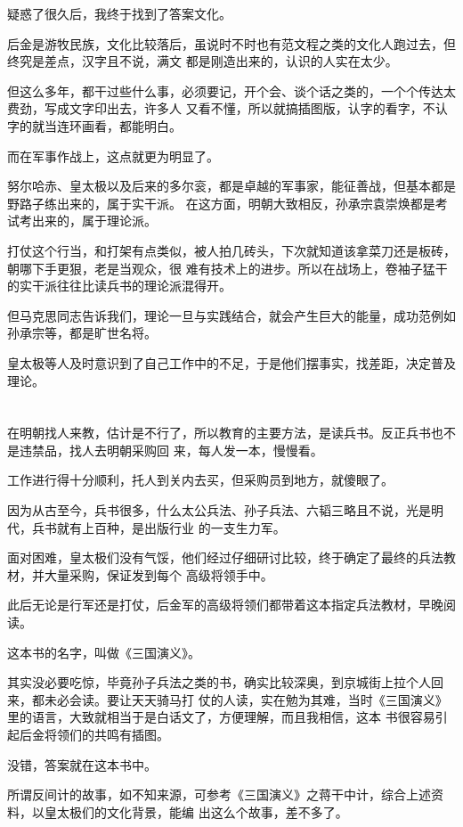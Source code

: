 \documentclass[11pt,a4paper,onecolumn]{article}
\begin{document}
疑惑了很久后，我终于找到了答案\myrule 文化。

后金是游牧民族，文化比较落后，虽说时不时也有范文程之类的文化人跑过去，但终究是差点，汉字且不说，满文
都是刚造出来的，认识的人实在太少。

但这么多年，都干过些什么事，必须要记，开个会、谈个话之类的，一个个传达太费劲，写成文字印出去，许多人
又看不懂，所以就搞插图版，认字的看字，不认字的就当连环画看，都能明白。

而在军事作战上，这点就更为明显了。

努尔哈赤、皇太极以及后来的多尔衮，都是卓越的军事家，能征善战，但基本都是野路子练出来的，属于实干派。
在这方面，明朝大致相反，孙承宗袁崇焕都是考试考出来的，属于理论派。

打仗这个行当，和打架有点类似，被人拍几砖头，下次就知道该拿菜刀还是板砖，朝哪下手更狠，老是当观众，很
难有技术上的进步。所以在战场上，卷袖子猛干的实干派往往比读兵书的理论派混得开。

但马克思同志告诉我们，理论一旦与实践结合，就会产生巨大的能量，成功范例如孙承宗等，都是旷世名将。

皇太极等人及时意识到了自己工作中的不足，于是他们摆事实，找差距，决定普及理论。

\section[\thesection]{}

在明朝找人来教，估计是不行了，所以教育的主要方法，是读兵书。反正兵书也不是违禁品，找人去明朝采购回
来，每人发一本，慢慢看。

工作进行得十分顺利，托人到关内去买，但采购员到地方，就傻眼了。

因为从古至今，兵书很多，什么太公兵法、孙子兵法、六韬三略且不说，光是明代，兵书就有上百种，是出版行业
的一支生力军。

面对困难，皇太极们没有气馁，他们经过仔细研讨比较，终于确定了最终的兵法教材，并大量采购，保证发到每个
高级将领手中。

此后无论是行军还是打仗，后金军的高级将领们都带着这本指定兵法教材，早晚阅读。

这本书的名字，叫做《三国演义》。

其实没必要吃惊，毕竟孙子兵法之类的书，确实比较深奥，到京城街上拉个人回来，都未必会读。要让天天骑马打
仗的人读，实在勉为其难，当时《三国演义》里的语言，大致就相当于是白话文了，方便理解，而且我相信，这本
书很容易引起后金将领们的共鸣\myrule 有插图。

没错，答案就在这本书中。

所谓反间计的故事，如不知来源，可参考《三国演义》之蒋干中计，综合上述资料，以皇太极们的文化背景，能编
出这么个故事，差不多了。
\end{document}
